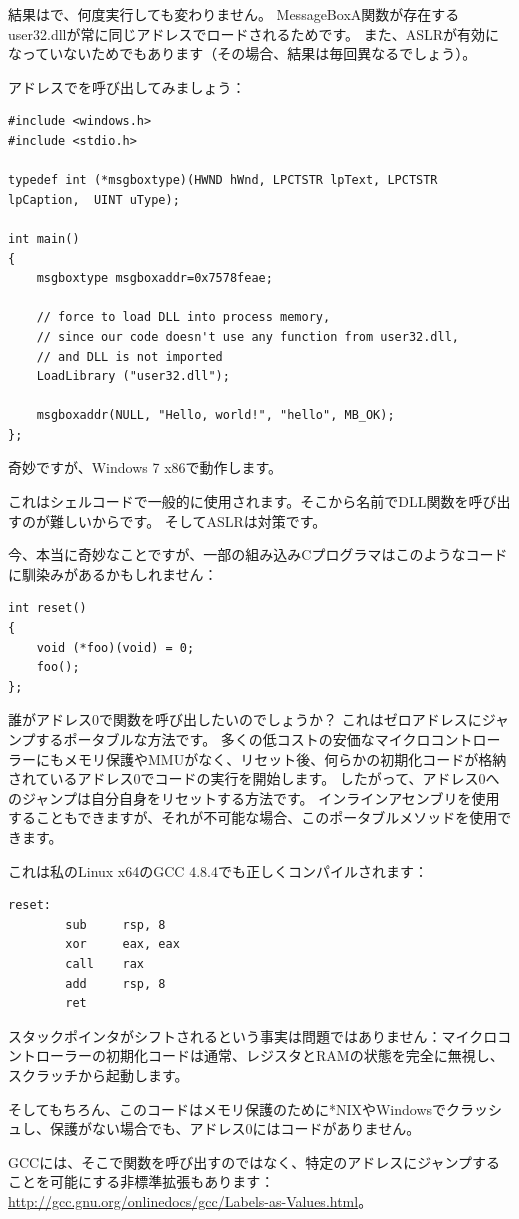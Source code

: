 結果はで、何度実行しても変わりません。
MessageBoxA関数が存在するuser32.dllが常に同じアドレスでロードされるためです。
また、\ac{ASLR}が有効になっていないためでもあります（その場合、結果は毎回異なるでしょう）。

アドレスでを呼び出してみましょう：

\begin{lstlisting}[style=customc]
#include <windows.h>
#include <stdio.h>

typedef int (*msgboxtype)(HWND hWnd, LPCTSTR lpText, LPCTSTR lpCaption,  UINT uType);

int main()
{
	msgboxtype msgboxaddr=0x7578feae;

	// force to load DLL into process memory, 
	// since our code doesn't use any function from user32.dll, 
	// and DLL is not imported
	LoadLibrary ("user32.dll");

	msgboxaddr(NULL, "Hello, world!", "hello", MB_OK);
};
\end{lstlisting}

奇妙ですが、Windows 7 x86で動作します。

これはシェルコードで一般的に使用されます。そこから名前でDLL関数を呼び出すのが難しいからです。
そして\ac{ASLR}は対策です。

今、本当に奇妙なことですが、一部の組み込みCプログラマはこのようなコードに馴染みがあるかもしれません：

\begin{lstlisting}[style=customc]
int reset()
{
	void (*foo)(void) = 0;
	foo();
};
\end{lstlisting}

誰がアドレス0で関数を呼び出したいのでしょうか？
これはゼロアドレスにジャンプするポータブルな方法です。
多くの低コストの安価なマイクロコントローラーにもメモリ保護や\ac{MMU}がなく、リセット後、何らかの初期化コードが格納されているアドレス0でコードの実行を開始します。
したがって、アドレス0へのジャンプは自分自身をリセットする方法です。
インラインアセンブリを使用することもできますが、それが不可能な場合、このポータブルメソッドを使用できます。

これは私のLinux x64のGCC 4.8.4でも正しくコンパイルされます：

\begin{lstlisting}[style=customasmx86]
reset:
        sub     rsp, 8
        xor     eax, eax
        call    rax
        add     rsp, 8
        ret
\end{lstlisting}

スタックポインタがシフトされるという事実は問題ではありません：マイクロコントローラーの初期化コードは通常、レジスタと\ac{RAM}の状態を完全に無視し、スクラッチから起動します。

そしてもちろん、このコードはメモリ保護のために*NIXやWindowsでクラッシュし、保護がない場合でも、アドレス0にはコードがありません。

GCCには、そこで関数を呼び出すのではなく、特定のアドレスにジャンプすることを可能にする非標準拡張もあります：
\url{http://gcc.gnu.org/onlinedocs/gcc/Labels-as-Values.html}。
